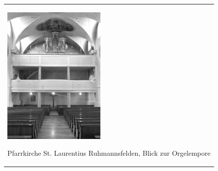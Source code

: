 \begin{center}
\begin{minipage}{5.593cm}
\begin{flushleft}
\tablefirsthead{}
\tablehead{}
\tabletail{}
\tablelasttail{}
\begin{supertabular}{m{5.393cm}}

\includegraphics[width=5.001cm,height=6.805cm]{pictures/zulassungsarbeit-img037.jpg}

Pfarrkirche St. Laurentius
Ruhmannsfelden, Blick zur Orgelempore\\
\end{supertabular}
\end{flushleft}
\end{minipage}
\end{center}

\begin{figure}
\img{}
\caption{}
\end{figure}

